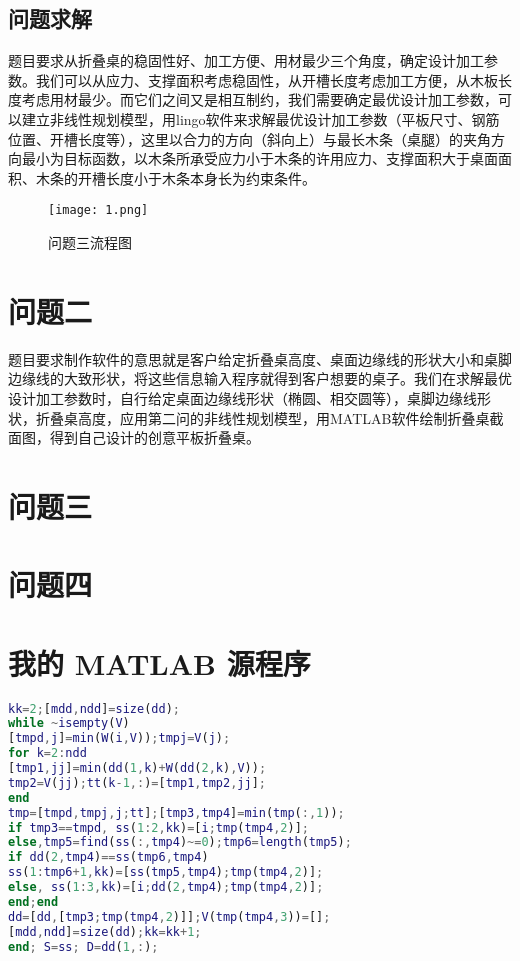 \documentclass[bwprint]{gmcmthesis}
\begin{document}
\subsection{问题求解}
题目要求从折叠桌的稳固性好、加工方便、用材最少三个角度，确定设计加工参数。我们可以从应力、支撑面积考虑稳固性，从开槽长度考虑加工方便，从木板长度考虑用材最少。而它们之间又是相互制约，我们需要确定最优设计加工参数，可以建立非线性规划模型，用lingo软件来求解最优设计加工参数（平板尺寸、钢筋位置、开槽长度等），这里以合力的方向（斜向上）与最长木条（桌腿）的夹角方向最小为目标函数，以木条所承受应力小于木条的许用应力、支撑面积大于桌面面积、木条的开槽长度小于木条本身长为约束条件。
\begin{figure}[!h]
\centering
\texttt{[image: 1.png]}
\caption{问题三流程图}
\end{figure}
\section{问题二}
题目要求制作软件的意思就是客户给定折叠桌高度、桌面边缘线的形状大小和桌脚边缘线的大致形状，将这些信息输入程序就得到客户想要的桌子。我们在求解最优设计加工参数时，自行给定桌面边缘线形状（椭圆、相交圆等），桌脚边缘线形状，折叠桌高度，应用第二问的非线性规划模型，用MATLAB软件绘制折叠桌截面图，得到自己设计的创意平板折叠桌。

\section{问题三}
\section{问题四}







\newpage
\appendix
\section{我的 MATLAB 源程序}
\begin{lstlisting}[language=Matlab]%设置不同语言即可。
kk=2;[mdd,ndd]=size(dd);
while ~isempty(V)
[tmpd,j]=min(W(i,V));tmpj=V(j);
for k=2:ndd
[tmp1,jj]=min(dd(1,k)+W(dd(2,k),V));
tmp2=V(jj);tt(k-1,:)=[tmp1,tmp2,jj];
end
tmp=[tmpd,tmpj,j;tt];[tmp3,tmp4]=min(tmp(:,1));
if tmp3==tmpd, ss(1:2,kk)=[i;tmp(tmp4,2)];
else,tmp5=find(ss(:,tmp4)~=0);tmp6=length(tmp5);
if dd(2,tmp4)==ss(tmp6,tmp4)
ss(1:tmp6+1,kk)=[ss(tmp5,tmp4);tmp(tmp4,2)];
else, ss(1:3,kk)=[i;dd(2,tmp4);tmp(tmp4,2)];
end;end
dd=[dd,[tmp3;tmp(tmp4,2)]];V(tmp(tmp4,3))=[];
[mdd,ndd]=size(dd);kk=kk+1;
end; S=ss; D=dd(1,:);


 \end{lstlisting}
\end{document}
